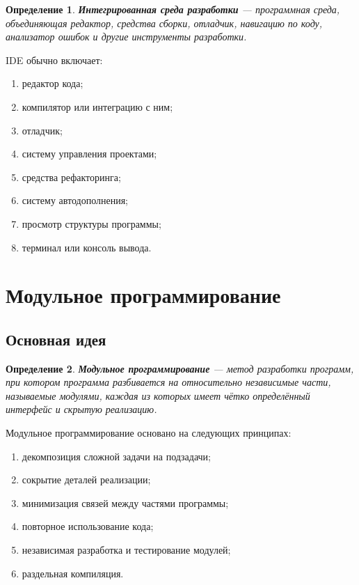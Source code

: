 \documentclass[12pt,a4paper]{article}
\newtheorem{definition}{Определение}
\begin{document}
\begin{definition}
\textbf{Интегрированная среда разработки} --- программная среда, объединяющая редактор, средства сборки, отладчик, навигацию по коду, анализатор ошибок и другие инструменты разработки.
\end{definition}

IDE обычно включает:
\begin{enumerate}
  \item редактор кода;
  \item компилятор или интеграцию с ним;
  \item отладчик;
  \item систему управления проектами;
  \item средства рефакторинга;
  \item систему автодополнения;
  \item просмотр структуры программы;
  \item терминал или консоль вывода.
\end{enumerate}

\section{Модульное программирование}

\subsection{Основная идея}

\begin{definition}
\textbf{Модульное программирование} --- метод разработки программ, при котором программа разбивается на относительно независимые части, называемые модулями, каждая из которых имеет чётко определённый интерфейс и скрытую реализацию.
\end{definition}

Модульное программирование основано на следующих принципах:
\begin{enumerate}
  \item декомпозиция сложной задачи на подзадачи;
  \item сокрытие деталей реализации;
  \item минимизация связей между частями программы;
  \item повторное использование кода;
  \item независимая разработка и тестирование модулей;
  \item раздельная компиляция.
\end{enumerate}
\end{document}
